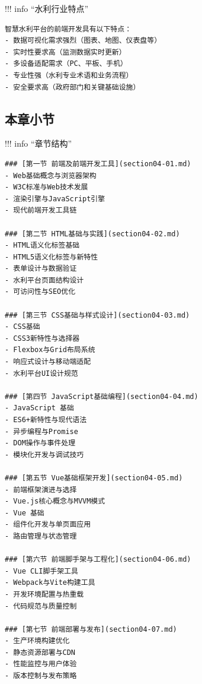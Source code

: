 !!! info ``水利行业特点''

\begin{verbatim}
智慧水利平台的前端开发具有以下特点：
- 数据可视化需求强烈（图表、地图、仪表盘等）
- 实时性要求高（监测数据实时更新）
- 多设备适配需求（PC、平板、手机）
- 专业性强（水利专业术语和业务流程）
- 安全要求高（政府部门和关键基础设施）
\end{verbatim}

\hypertarget{ux672cux7ae0ux5c0fux8282}{%
\subsection{本章小节}\label{ux672cux7ae0ux5c0fux8282}}

!!! info ``章节结构''

\begin{verbatim}
### [第一节 前端及前端开发工具](section04-01.md)
- Web基础概念与浏览器架构
- W3C标准与Web技术发展
- 渲染引擎与JavaScript引擎
- 现代前端开发工具链

### [第二节 HTML基础与实践](section04-02.md)
- HTML语义化标签基础
- HTML5语义化标签与新特性
- 表单设计与数据验证
- 水利平台页面结构设计
- 可访问性与SEO优化

### [第三节 CSS基础与样式设计](section04-03.md)
- CSS基础
- CSS3新特性与选择器
- Flexbox与Grid布局系统
- 响应式设计与移动端适配
- 水利平台UI设计规范

### [第四节 JavaScript基础编程](section04-04.md)
- JavaScript 基础
- ES6+新特性与现代语法
- 异步编程与Promise
- DOM操作与事件处理
- 模块化开发与调试技巧

### [第五节 Vue基础框架开发](section04-05.md)
- 前端框架演进与选择
- Vue.js核心概念与MVVM模式
- Vue 基础
- 组件化开发与单页面应用
- 路由管理与状态管理

### [第六节 前端脚手架与工程化](section04-06.md)
- Vue CLI脚手架工具
- Webpack与Vite构建工具
- 开发环境配置与热重载
- 代码规范与质量控制

### [第七节 前端部署与发布](section04-07.md)
- 生产环境构建优化
- 静态资源部署与CDN
- 性能监控与用户体验
- 版本控制与发布策略
\end{verbatim}


